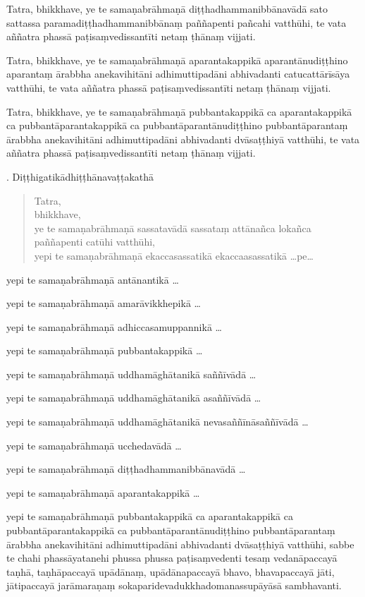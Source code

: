 \documentclass[11pt,twoside,openright]{book}
\begin{document}
\pstart
Tatra, bhikkhave, ye te samaṇabrāhmaṇā diṭṭhadhammanibbānavādā sato sattassa paramadiṭṭhadhammanibbānaṃ paññapenti pañcahi vatthūhi, te vata aññatra phassā paṭisaṃvedissantīti netaṃ ṭhānaṃ vijjati.
\pend

\pstart
Tatra, bhikkhave, ye te samaṇabrāhmaṇā aparantakappikā aparantānudiṭṭhino aparantaṃ ārabbha anekavihitāni adhimuttipadāni abhivadanti catucattārīsāya vatthūhi, te vata aññatra phassā paṭisaṃvedissantīti netaṃ ṭhānaṃ vijjati.
\pend

\pstart
Tatra, bhikkhave, ye te samaṇabrāhmaṇā pubbantakappikā ca aparantakappikā ca pubbantāparantakappikā ca pubbantāparantānudiṭṭhino pubbantāparantaṃ ārabbha anekavihitāni adhimuttipadāni abhivadanti dvāsaṭṭhiyā vatthūhi, te vata aññatra phassā paṭisaṃvedissantīti netaṃ ṭhānaṃ vijjati.
\pend

. Diṭṭhigatikādhiṭṭhānavaṭṭakathā
\pend

\begin{verse}
Tatra,\\
\vin  bhikkhave,\\
\vin  ye te samaṇabrāhmaṇā sassatavādā sassataṃ attānañca lokañca paññapenti catūhi vatthūhi,\\
\vin  yepi te samaṇabrāhmaṇā ekaccasassatikā ekaccaasassatikā …pe…

\end{verse}
\pstart
yepi te samaṇabrāhmaṇā antānantikā …
\pend

\pstart
yepi te samaṇabrāhmaṇā amarāvikkhepikā …
\pend

\pstart
yepi te samaṇabrāhmaṇā adhiccasamuppannikā …
\pend

\pstart
yepi te samaṇabrāhmaṇā pubbantakappikā …
\pend

\pstart
yepi te samaṇabrāhmaṇā uddhamāghātanikā saññīvādā …
\pend

\pstart
yepi te samaṇabrāhmaṇā uddhamāghātanikā asaññīvādā …
\pend

\pstart
yepi te samaṇabrāhmaṇā uddhamāghātanikā nevasaññīnāsaññīvādā …
\pend

\pstart
yepi te samaṇabrāhmaṇā ucchedavādā …
\pend

\pstart
yepi te samaṇabrāhmaṇā diṭṭhadhammanibbānavādā …
\pend

\pstart
yepi te samaṇabrāhmaṇā aparantakappikā …
\pend

\pstart
yepi te samaṇabrāhmaṇā pubbantakappikā ca aparantakappikā ca pubbantāparantakappikā ca pubbantāparantānudiṭṭhino pubbantāparantaṃ ārabbha anekavihitāni adhimuttipadāni abhivadanti dvāsaṭṭhiyā vatthūhi, sabbe te chahi phassāyatanehi phussa phussa paṭisaṃvedenti tesaṃ vedanāpaccayā taṇhā, taṇhāpaccayā upādānaṃ, upādānapaccayā bhavo, bhavapaccayā jāti, jātipaccayā jarāmaraṇaṃ sokaparidevadukkhadomanassupāyāsā sambhavanti.
\pend
\end{document}
